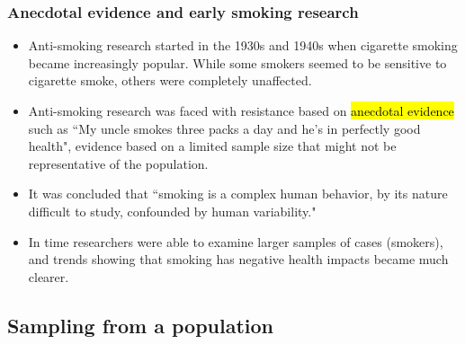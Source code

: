\documentclass[11pt,containsverbatim,handout]{beamer}
\begin{document}

\begin{frame}
	\frametitle{Anecdotal evidence and early smoking research}

	\begin{itemize}
	\setlength\leftskip{-2em}

	\item Anti-smoking research started in the 1930s and 1940s when cigarette smoking became increasingly popular. While some smokers seemed to be sensitive to cigarette smoke, others were completely unaffected.

	\item Anti-smoking research was faced with resistance based on \hl{anecdotal evidence} such as ``My uncle smokes three packs a day and he's in perfectly good health", evidence based on a limited sample size that might not be representative of the population.

	\item It was concluded that ``smoking is a complex human behavior, by its nature difficult to study, confounded by human variability."

	\item In time researchers were able to examine larger samples of cases (smokers), and trends showing that smoking has negative health impacts became much clearer.

	\end{itemize}


\end{frame}


\subsection{Sampling from a population}

\end{document}
